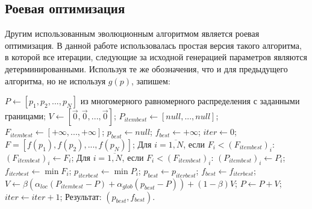 \subsection{Роевая оптимизация}
Другим использованным эволюционным алгоритмом является роевая оптимизация. В данной работе использовалась простая версия такого алгоритма, в которой все итерации, следующие за исходной генерацией параметров являются детерминированными. Используя те же обозначения, что и для предыдущего алгоритма, но не используя $g(p)$, запишем:
\begin{algorithm}
\begin{algorithmic}
\State $P \gets [p_1, p_2, ..., p_N]$ из многомерного равномерного распределения с заданными границами;
\State $V \gets [\vec{0}, \vec{0}, ..., \vec{0}]$;
\State $P_{itembest} \gets [null, ..., null]$;
\State $F_{itembest} \gets [+\infty, ..., +\infty]$;
\State $p_{best} \gets null$;
\State $f_{best} \gets +\infty$;
\State $iter \gets 0$;
	\State $F = [f(p_1), f(p_2), ..., f(p_N)]$;
	\State Для $i=\overline{1,N}$, если $F_i < (F_{itembest})_i$: $(F_{itembest})_i \gets F_i$;
	\State Для $i=\overline{1,N}$, если $F_i < (F_{itembest})_i$: $(P_{itembest})_i \gets P_i$;
	\State $f_{iterbest} \gets \min{F_i}$;
	\State $p_{iterbest} \gets \min{P_i}$;
		\State $p_{best} \gets p_{iterbest}$;
		\State $f_{best} \gets f_{iterbest}$;
	\EndIf
	\State $V \gets \beta(\alpha_{loc}(P_{itembest} - P)+\alpha_{glob}(p_{best} - P)) + (1-\beta)V$;
	\State $P \gets P + V$;
	\State $iter \gets iter+1$;
\EndWhile
\State Результат: $(p_{best}, f_{best})$.
\end{algorithmic}
\end{algorithm}